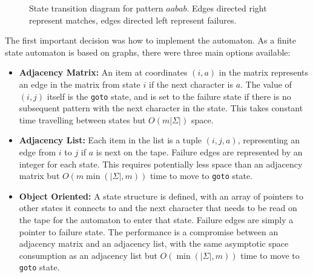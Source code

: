 \documentclass[ %
                    author={Dominic Joseph Moylett},
                    degree={MEng},
                     title={Dictionary Matching with Fingerprints},
                  subtitle={An Empirical Analysis},
                      type={research},
                      year={2015} ]{dissertation}
\begin{document}
\begin{figure}[t]
  \centering
  \caption{State transition diagram for pattern $aabab$. Edges directed right represent matches, edges directed left represent failures.}
  \label{fig:kmp-pattern-failure}
\end{figure}

The first important decision was how to implement the automaton. As a finite state automaton is based on graphs, there were three main options available:

\begin{itemize}
  \item \textbf{Adjacency Matrix:} An item at coordinates $(i,a)$ in the matrix represents an edge in the matrix from state $i$ if the next character is $a$. The value of $(i,j)$ itself is the \texttt{goto} state, and is set to the failure state if there is no subsequent pattern with the next character in the state. This takes constant time travelling between states but $O(m|\Sigma|)$ space.
  \item \textbf{Adjacency List:} Each item in the list is a tuple $(i, j, a)$, representing an edge from $i$ to $j$ if $a$ is next on the tape. Failure edges are represented by an integer for each state. This requires potentially less space than an adjacency matrix but $O(m \min(|\Sigma|, m))$ time to move to \texttt{goto} state.
  \item \textbf{Object Oriented:} A state structure is defined, with an array of pointers to other states it connects to and the next character that needs to be read on the tape for the automaton to enter that state. Failure edges are simply a pointer to failure state. The performance is a compromise between an adjacency matrix and an adjacency list, with the same asymptotic space consumption as an adjacency list but $O(\min(|\Sigma|, m))$ time to move to \texttt{goto} state.
\end{itemize}
\end{document}
